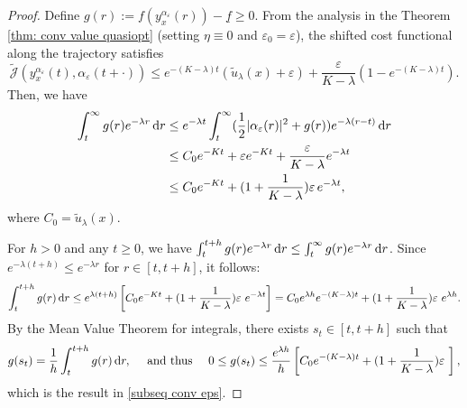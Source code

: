 \documentclass[12pt]{amsart}
\newcommand{\D}[1]{\mbox{\rm #1}}
\newcommand{\dd}{\D{d}}
\numberwithin{equation}{section}
\theoremstyle{plain}
\begin{document}
\begin{proof}
Define $g(r) := f(y_x^{\alpha_{\varepsilon}}(r)) - \underline{f}  \ge 0$. From the  analysis in  the Theorem  \ref{thm: conv value quasiopt} (setting $\eta \equiv 0$ and $\varepsilon_0 = \varepsilon$), the shifted cost functional along the trajectory satisfies
\begin{equation*}
\widetilde{\mathscr{J}}(y_x^{\alpha_{\varepsilon}}(t), \alpha_{\varepsilon}(t+\cdot)) \le e^{-(K-\lambda)t} (\tilde{u}_\lambda(x) + \varepsilon) + \frac{\varepsilon}{K-\lambda}(1 - e^{-(K-\lambda)t}).
\end{equation*}
Then, we have
\begin{equation}\label{eq: quasi_integral}
\begin{aligned}
    \int_t^\infty g(r)e^{-\lambda r} \,\dd r 
    & \le e^{-\lambda t} \int_t^\infty (\frac{1}{2}|\alpha_\varepsilon(r)|^2 + g(r))e^{-\lambda(r-t)} \,\dd r \\
    &\le C_0 e^{-Kt} + \varepsilon e^{-Kt}+ \frac{\varepsilon}{K-\lambda}e^{-\lambda t}\\
    & \le C_0 e^{-Kt} +(1+ \frac{1}{K-\lambda}) \varepsilon\, e^{-\lambda t},
\end{aligned}
\end{equation}
where $C_0 = \tilde{u}_\lambda(x)$.

For $h > 0$ and  any $t \ge 0$, we have $\int_t^{t+h} g(r) e^{-\lambda r} \,\dd r \le \int_t^\infty g(r) e^{-\lambda r} \,\dd r$. Since $e^{-\lambda(t+h)} \le e^{-\lambda r}$ for $r \in [t, t+h]$, it follows:
\begin{equation*}
\int_t^{t+h} g(r) \,\dd r \le e^{\lambda(t+h)} \left[ C_0 e^{-Kt} + (1+ \frac{1}{K-\lambda}) \varepsilon\ e^{-\lambda t} \right] = C_0 e^{\lambda h} e^{-(K-\lambda)t} + (1+ \frac{1}{K-\lambda}) \varepsilon\ e^{\lambda h}.
\end{equation*}
By the Mean Value Theorem for integrals, there exists $s_t \in [t, t+h]$ such that
\begin{equation*}
    g(s_t) = \frac{1}{h} \int_t^{t+h} g(r) \,\dd r, \quad \text{ and thus } \quad
    0 \le g(s_t) \le \frac{e^{\lambda h}}{h} \left[ C_0 e^{-(K-\lambda)t} + (1+ \frac{1}{K-\lambda}) \varepsilon\ \right],
\end{equation*}
which is the result in \ref{subseq conv eps}. 


\end{proof}
\end{document}
